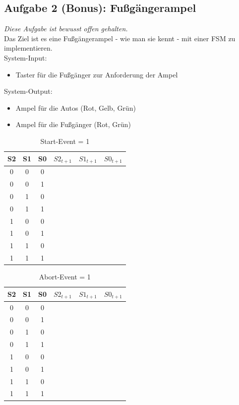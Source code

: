\documentclass[a4paper]{scrartcl}
\begin{document}
\subsection*{Aufgabe 2 (Bonus): Fußgängerampel}
\textit{Diese Aufgabe ist bewusst offen gehalten.}\\
Das Ziel ist es eine Fußgängerampel - wie man sie kennt - mit einer FSM zu implementieren.\\
System-Input:
\begin{itemize}
  \item Taster für die Fußgänger zur Anforderung der Ampel
\end{itemize}

System-Output:
\begin{itemize}
  \item Ampel für die Autos (Rot, Gelb, Grün)
  \item Ampel für die Fußgänger (Rot, Grün)
\end{itemize}

\newpage
\begin{table}[h]
  \centering
  \begin{tabular}{ccc|ccc}
    S2 & S1 & S0 & $S2_{t+1}$ & $S1_{t+1}$ & $S0_{t+1}$\\ \hline
    0&0&0& & & \\
    0&0&1& & & \\
    0&1&0& & & \\
    0&1&1& & & \\
    1&0&0& & & \\
    1&0&1& & & \\
    1&1&0& & & \\
    1&1&1& & & \\
    
  \end{tabular}
  \caption{Start-Event = 1}
\end{table}

\begin{table}[h]
  \centering
  \begin{tabular}{ccc|ccc}
    S2 & S1 & S0 & $S2_{t+1}$ & $S1_{t+1}$ & $S0_{t+1}$\\ \hline
    0&0&0& & & \\
    0&0&1& & & \\
    0&1&0& & & \\
    0&1&1& & & \\
    1&0&0& & & \\
    1&0&1& & & \\
    1&1&0& & & \\
    1&1&1& & & \\
    
  \end{tabular}
  \caption{Abort-Event = 1}
\end{table}
\end{document}
